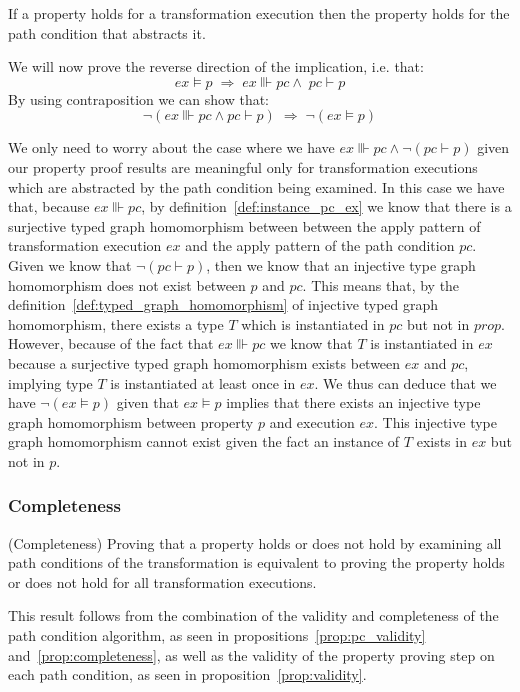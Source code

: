 \begin{lemma}{If a property holds for a transformation execution then the property holds for the path condition that abstracts it.}
\label{lemma:validity2}
\end{lemma}
\begin{pf}
We will now prove the reverse direction of the implication, i.e. that:
$$ex\models p \;\Longrightarrow\;ex\Vvdash pc\land\; pc\vdash p$$
By using contraposition we can show that:
$$\neg(ex\Vvdash pc\land pc\vdash p) \;\Longrightarrow\; \neg(ex\models p)$$

We only need to worry about the case where we have  $ex\Vvdash pc\land
\neg(pc\vdash p)$ given our property proof results are meaningful only for
transformation executions which are abstracted by the path condition being
examined. In this case we have that, because $ex\Vvdash pc$, by
definition~\ref{def:instance_pc_ex} we know that there is a surjective typed
graph homomorphism between between the apply pattern of transformation execution
$ex$ and the apply pattern of the path condition $pc$. Given we know that
$\neg(pc\vdash p)$, then we know that an injective type graph homomorphism does
not exist between $p$ and $pc$. This means that, by the
definition~\ref{def:typed_graph_homomorphism} of injective typed graph
homomorphism, there exists a type $T$ which is instantiated in $pc$ but not in
$prop$. However, because of the fact that $ex\Vvdash pc$ we know that $T$ is
instantiated in $ex$ because a surjective typed graph homomorphism exists
between $ex$ and $pc$, implying type $T$ is instantiated at least once in $ex$.
We thus can deduce that we have $\neg(ex\models p)$ given that $ex\models p$
implies that there exists an injective type graph homomorphism between property
$p$ and execution $ex$. This injective type graph homomorphism cannot exist given the fact an instance
of $T$ exists in $ex$ but not in $p$.
\end{pf}

\subsubsection{Completeness}


\begin{proposition}{(Completeness) Proving that a property holds or does not
hold by examining all path conditions of the transformation is equivalent to
proving the property holds or does not hold for all transformation executions.}
\label{prop:PP_completeness}
\end{proposition}
\begin{ps}
This result follows from the combination of the validity and completeness of the
path condition algorithm, as seen in propositions~\ref{prop:pc_validity}
and~\ref{prop:completeness}, as well as the validity of the property proving
step on each path condition, as seen in proposition~\ref{prop:validity}.
\end{ps}



